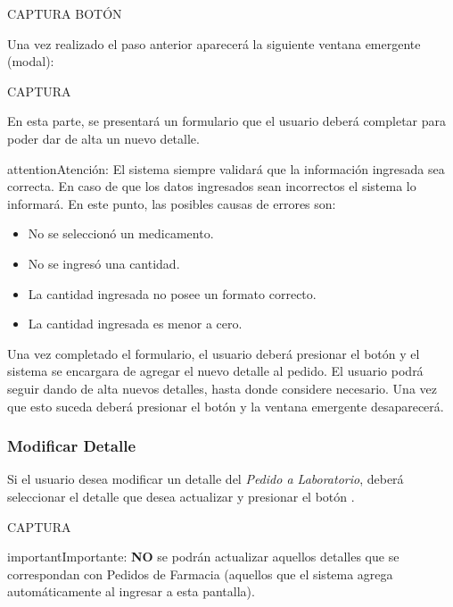 \documentclass[a4paper,10pt,spanish]{sphinxmanual}
\begin{document}
CAPTURA BOTÓN

Una vez realizado el paso anterior aparecerá la siguiente ventana emergente (modal):

CAPTURA

En esta parte, se presentará un formulario que el usuario deberá completar para poder dar de alta un nuevo detalle.

\begin{notice}{attention}{Atención:}
El sistema siempre validará que la información ingresada sea correcta. En caso de que los datos ingresados sean incorrectos el sistema lo informará.
En este punto, las posibles causas de errores son:
\begin{itemize}
\item {} 
No se seleccionó un medicamento.

\item {} 
No se ingresó una cantidad.

\item {} 
La cantidad ingresada no posee un formato correcto.

\item {} 
La cantidad ingresada es menor a cero.

\end{itemize}
\end{notice}

Una vez completado el formulario, el usuario deberá presionar el botón  y el sistema se encargara de agregar el nuevo detalle al pedido.
El usuario podrá seguir dando de alta nuevos detalles, hasta donde considere necesario. Una vez que esto suceda deberá presionar el botón  y la ventana emergente desaparecerá.


\subsubsection{Modificar Detalle}
\label{pedidosalab:modificar-detalle}\label{pedidosalab:modificar-detalle-pl}
Si el usuario desea modificar un detalle del \emph{Pedido a Laboratorio}, deberá seleccionar el detalle que desea actualizar y presionar el botón .

CAPTURA

\begin{notice}{important}{Importante:}
\textbf{NO} se podrán actualizar aquellos detalles que se correspondan con Pedidos de Farmacia (aquellos que el sistema agrega automáticamente al ingresar a esta pantalla).
\end{notice}
\end{document}
